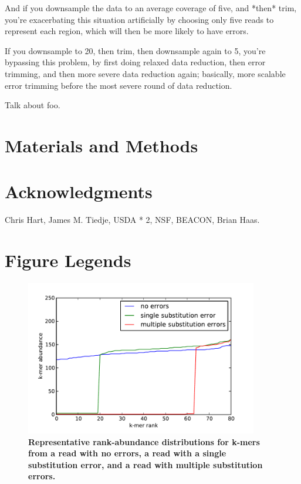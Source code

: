 \documentclass[10pt]{article}
\begin{document}
And if you downsample the data to an average coverage of five, and
*then* trim, you're exacerbating this situation artificially by
choosing only five reads to represent each region, which will then be
more likely to have errors.

If you downsample to 20, then trim, then
downsample again to 5, you're bypassing this problem, by first doing
relaxed data reduction, then error trimming, and then more severe data
reduction again; basically, more scalable error trimming before the
most severe round of data reduction.

Talk about foo.

\section*{Materials and Methods}

\section*{Acknowledgments}

Chris Hart, James M. Tiedje, USDA * 2, NSF, BEACON, Brian Haas.



\newpage

\section*{Figure Legends}

\begin{figure}
\centerline{\includegraphics[width=4in]{diginorm-ranks.pdf}}
\caption{
{\bf Representative rank-abundance distributions for k-mers from a read with no errors,
a read with a single substitution error, and a read with multiple
substitution errors.}}
\label{fig:rankabund}
\end{figure}
\end{document}
